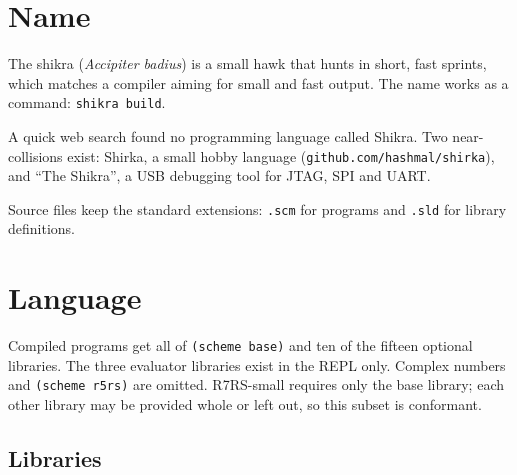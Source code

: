 \documentclass[a4paper,11pt]{article}
\begin{document}
\section{Name}

The shikra (\emph{Accipiter badius}) is a small hawk that hunts in short,
fast sprints, which matches a compiler aiming for small and fast output. The
name works as a command: \texttt{shikra build}.

A quick web search found no programming language called Shikra. Two
near-collisions exist: Shirka, a small hobby language
(\texttt{github.com/hashmal/shirka}), and ``The Shikra'', a USB debugging
tool for JTAG, SPI and UART.

Source files keep the standard extensions: \texttt{.scm} for programs and
\texttt{.sld} for library definitions.

\section{Language}

Compiled programs get all of \texttt{(scheme base)} and ten of the fifteen
optional libraries. The three evaluator libraries exist in the REPL only.
Complex numbers and \texttt{(scheme r5rs)} are omitted. R7RS-small requires
only the base library; each other library may be provided whole or left out,
so this subset is conformant.

\subsection{Libraries}
\end{document}
